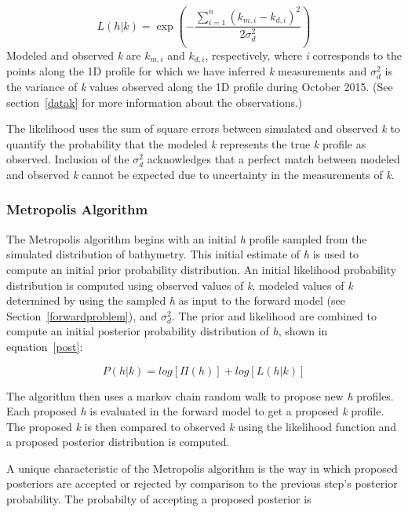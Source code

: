 \begin{equation} \label{likely}
L\left(h|%
k\right)=\exp\left(- \frac{\sum\limits_{i=1}^n({k}_{m,i}-k_{d,i})^2}{2\sigma_{d}^2}\right)
\end{equation} 
Modeled and observed \textit{k} are ${k}_{m,i}$ and $k_{d,i}$, respectively, where \textit{i} corresponds to the points along the 1D profile for which we have inferred \textit{k} measurements and $\sigma_{d}^2$ is the variance of \textit{k} values observed along the 1D profile during October 2015. (See section~\ref{datak} for more information about the observations.) 

The likelihood uses the sum of square errors between simulated and observed \textit{k} to quantify the probability that the modeled \textit{k} represents the true \textit{k} profile as observed. Inclusion of the $\sigma_{d}^2$ acknowledges that a perfect match between modeled and observed \textit{k} cannot be expected due to uncertainty in the measurements of \textit{k}.

\subsubsection{Metropolis Algorithm}
The Metropolis algorithm begins with an initial \textit{h} profile sampled from the simulated distribution of bathymetry. This initial estimate of \textit{h} is used to compute an initial prior probability distribution. An initial likelihood probability distribution is computed using observed values of \textit{k}, modeled values of \textit{k} determined by using the sampled \textit{h} as input to the forward model (see Section~\ref{forwardproblem}), and $\sigma_{d}^2$. The prior and likelihood are combined to compute an initial posterior probability distribution of \textit{h}, shown in equation~\ref{post}:

\begin{equation}\label{post}
P(h|%
k) = log[\Pi(h)] + log[L(h|%
k)]
\end{equation}

The algorithm then uses a markov chain random walk to propose new \textit{h} profiles. Each proposed \textit{h} is evaluated in the forward model to get a proposed \textit{k} profile. The proposed \textit{k} is then compared to observed \textit{k} using the likelihood function and a proposed posterior distribution is computed.

A unique characteristic of the Metropolis algorithm is the way in which proposed posteriors are accepted or rejected by comparison to the previous step's posterior probability. The probabilty of accepting a proposed posterior is 

